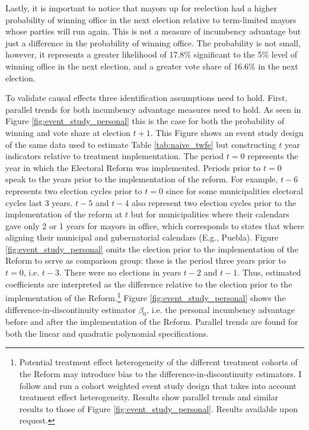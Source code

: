 \documentclass[12pt]{amsart}
\makeatletter
\def\subsection{\@startsection{subsection}{2}
	\z@{.8\linespacing\@plus.7\linespacing}{.7\linespacing}{\large}}
\numberwithin{equation}{section}
\theoremstyle{definition}
\theoremstyle{definition}
\theoremstyle{definition}
\makeatother
\begin{document}
Lastly, it is important to notice that mayors up for reelection had a higher probability of winning office in the next election relative to term-limited mayors whose parties will run again. This is not a measure of incumbency advantage but just a difference in the probability of winning office. The probability is not small, however, it represents a greater likelihood of 17.8\% significant to the 5\% level of winning office in the next election, and a greater vote share of 16.6\% in the next election. 
   
\subsection{Identification assumptions} 

To validate causal effects three identification assumptions need to hold. First, parallel trends for both incumbency advantage measures need to hold. As seen in Figure \ref{fig:event_study_personal}  this is the case for both the probability of winning and vote share at election $t+1$. This Figure shows an event study design of the same data used to estimate Table \ref{tab:naive_twfe} but constructing $t$ year indicators relative to treatment implementation. The period $t=0$ represents the year in which the Electoral Reform was implemented. Periods prior to $t=0$ speak to the years prior to the implementation of the reform. For example, $t-6$ represents two election cycles prior to $t=0$ since for some municipalities electoral cycles last 3 years.  $t-5$ and $t-4$ also represent two election cycles prior to the implementation of the reform at $t$ but for municipalities where their calendars gave only 2 or 1 years for mayors in office, which corresponds to states that where aligning their municipal and gubernatorial calendars (E.g., Puebla). Figure \ref{fig:event_study_personal} omits the election prior to the implementation of the Reform to serve as comparison group: these is the period three years prior to $t=0$, i.e. $t-3$. There were no elections in years $t-2$ and $t-1$. Thus, estimated coefficients are interpreted as the difference relative to the election prior to the implementation of the Reform.\footnote{Potential treatment effect heterogeneity of the different treatment cohorts of the Reform may introduce bias to the difference-in-discontinuity estimators. I follow \citet{abraham_sun_2020} and run a cohort weighted event study design that takes into account treatment effect heterogeneity. Results show parallel trends and similar results to those of  Figure \ref{fig:event_study_personal}. Results available upon request.} Figure \ref{fig:event_study_personal} shows the difference-in-discontinuity estimator $\beta_0$, i.e. the personal incumbency advantage before and after the implementation of the Reform. Parallel trends are found for both the linear and quadratic polynomial specifications.  
\end{document}
